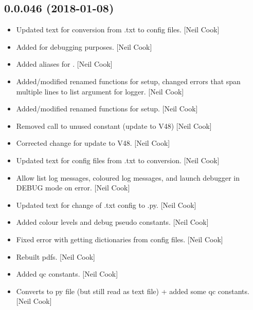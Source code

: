 \documentclass[a4paper,10pt,english]{report}
\begin{document}
\subsection{0.0.046 (2018-01-08)}
\label{\detokenize{misc/changelog:id505}}\begin{itemize}
\item {} 
Updated text for conversion from .txt to  config files. {[}Neil Cook{]}

\item {} 
Added  for debugging purposes. {[}Neil Cook{]}

\item {} 
Added aliases for . {[}Neil Cook{]}

\item {} 
Added/modified renamed functions for setup, changed errors that span
multiple lines to list argument for logger. {[}Neil Cook{]}

\item {} 
Added/modified renamed functions for setup. {[}Neil Cook{]}

\item {} 
Removed call to unused constant (update to V48) {[}Neil Cook{]}

\item {} 
Corrected change for update to V48. {[}Neil Cook{]}

\item {} 
Updated text for config files from .txt to  conversion. {[}Neil Cook{]}

\item {} 
Allow list log messages, coloured log messages, and launch debugger in
DEBUG mode on error. {[}Neil Cook{]}

\item {} 
Updated text for change of .txt config to .py. {[}Neil Cook{]}

\item {} 
Added colour levels and debug pseudo constants. {[}Neil Cook{]}

\item {} 
Fixed error with getting dictionaries from config files. {[}Neil Cook{]}

\item {} 
Rebuilt pdfs. {[}Neil Cook{]}

\item {} 
Added qc constants. {[}Neil Cook{]}

\item {} 
Converts to py file (but still read as text file) + added some qc
constants. {[}Neil Cook{]}


\end{itemize}
\end{document}
